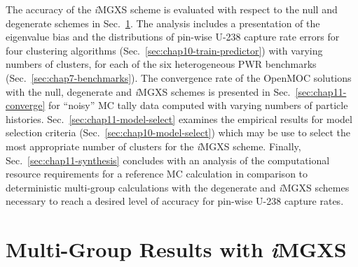 The accuracy of the \textit{i}\ac{MGXS} scheme is evaluated with respect to the null and degenerate schemes in Sec.~\ref{subsec:chap11-imgxs-results}. The analysis includes a presentation of the eigenvalue bias and the distributions of pin-wise U-238 capture rate errors for four clustering algorithms (Sec.~\ref{sec:chap10-train-predictor}) with varying numbers of clusters, for each of the six heterogeneous \ac{PWR} benchmarks (Sec.~\ref{sec:chap7-benchmarks}). The convergence rate of the OpenMOC solutions with the null, degenerate and \textit{i}\ac{MGXS} schemes is presented in Sec.~\ref{sec:chap11-converge} for ``noisy'' \ac{MC} tally data computed with varying numbers of particle histories. Sec.~\ref{sec:chap11-model-select} examines the empirical results for model selection criteria (Sec.~\ref{sec:chap10-model-select}) which may be use to select the most appropriate number of clusters for the \textit{i}\ac{MGXS} scheme. Finally, Sec.~\ref{sec:chap11-synthesis} concludes with an analysis of the computational resource requirements for a reference \ac{MC} calculation in comparison to deterministic multi-group calculations with the degenerate and \textit{i}\ac{MGXS} schemes necessary to reach a desired level of accuracy for pin-wise U-238 capture rates.


\section{Multi-Group Results with \textit{i}MGXS}
\label{subsec:chap11-imgxs-results}

